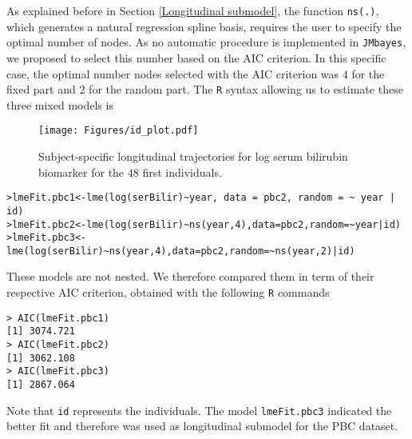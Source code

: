 \documentclass[12pt]{article}
\begin{document}
As explained before in Section \ref{Longitudinal submodel}, the function \texttt{ns(.)}, which generates a natural regression spline basis, requires the user to specify the optimal number of nodes. As no automatic procedure is implemented in \texttt{JMbayes}, we proposed to select this number based on the AIC criterion. In this specific case, the optimal number nodes selected with the AIC criterion was $4$ for the fixed part and $2$ for the random part. The \texttt{R} syntax allowing us to estimate these three mixed models is
\begin{figure}[!tb]
\centering
\texttt{[image: Figures/id\_plot.pdf]}
\caption{Subject-specific longitudinal trajectories for log serum bilirubin biomarker for the $48$ first individuals.}
\label{id_plot}
\end{figure}
\begin{verbatim}
>lmeFit.pbc1<-lme(log(serBilir)~year, data = pbc2, random = ~ year | id)
>lmeFit.pbc2<-lme(log(serBilir)~ns(year,4),data=pbc2,random=~year|id)
>lmeFit.pbc3<-lme(log(serBilir)~ns(year,4),data=pbc2,random=~ns(year,2)|id)
\end{verbatim}
These models are not nested. We therefore compared them in term of their respective AIC criterion, obtained with the following \texttt{R} commands
\begin{verbatim}
> AIC(lmeFit.pbc1)
[1] 3074.721
> AIC(lmeFit.pbc2)
[1] 3062.108
> AIC(lmeFit.pbc3)
[1] 2867.064
\end{verbatim}
Note that \texttt{id} represents the individuals. 
The model \texttt{lmeFit.pbc3} indicated the better fit and therefore was used as longitudinal submodel for the PBC dataset. 

%
%
%
%
\end{document}
